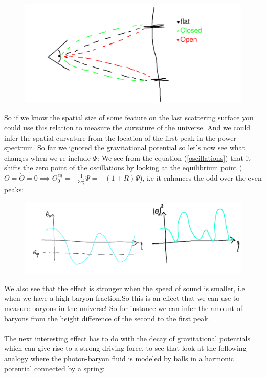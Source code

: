 \documentclass{article}
\begin{document}
\begin{figure}[h]
  \centering
  \includegraphics[scale=.5]{Universes.png}
\end{figure}
So if we know the spatial size of some feature on the last scattering surface you could use this relation to measure the curvature of the universe. And we could infer the spatial curvature from the location of the first peak in the power spectrum. So far we ignored the gravitational potential so let's now see what changes when we re-include $\Psi$:
We see from the equation (\ref{oscillations}) that it shifts the zero point of the oscillations by looking at the equilibrium point ($\ddot{\Theta} = \dot{\Theta} = 0 \implies \Theta_0^{eq} = - \frac{1}{3c_s^2}\Psi = -(1+R)\Psi$), i.e it enhances the odd over the even peaks:
\begin{figure}[h]
  \centering
  \includegraphics[scale=.5]{gravpot.png}
\end{figure}
We also see that the effect is stronger when the speed of sound is smaller, i.e when we have a high baryon fraction.So this is an effect that we can use to measure baryons in the universe! So for instance we can infer the amount of baryons from the height difference of the second to the first peak.
\\\\
The next interesting effect has to do with the decay of gravitational potentials which can give rise to a strong driving force, to see that look at the following analogy where the photon-baryon fluid is modeled by balls in a harmonic potential connected by a spring:
\end{document}
